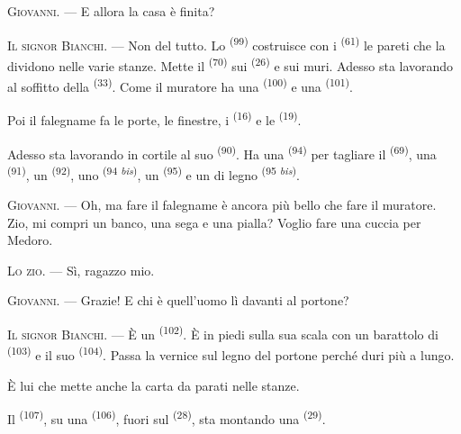 \textsc{Giovanni}. --- E allora la casa è finita?

\VUsaut{3.0mm}
\VUsaut{3.0mm}

\textsc{Il signor Bianchi}. --- Non del tutto. Lo 
\textsuperscript{(99)} costruisce con i  \textsuperscript{(61)} le
pareti che la dividono nelle varie stanze. Mette il 
\textsuperscript{(70)} sui  \textsuperscript{(26)} e sui muri.
Adesso sta lavorando al soffitto della  \textsuperscript{(33)}. Come
il muratore ha una  \textsuperscript{(100)} e una
 \textsuperscript{(101)}.

Poi il falegname fa le porte, le finestre, i 
\textsuperscript{(16)} e le  \textsuperscript{(19)}.

Adesso sta lavorando in cortile al suo  \textsuperscript{(90)}. Ha una
 \textsuperscript{(94)} per tagliare il 
\textsuperscript{(69)}, una  \textsuperscript{(91)}, un
 \textsuperscript{(92)}, uno 
\textsuperscript{(94 \textit{bis})}, un  \textsuperscript{(95)} e un
 di legno \textsuperscript{(95 \textit{bis})}.

\textsc{Giovanni}. --- Oh, ma fare il falegname è ancora più bello che fare il
muratore. Zio, mi compri un banco, una sega e una pialla? Voglio fare una cuccia per
Medoro.

\textsc{Lo zio}. --- Sì, ragazzo mio.

\textsc{Giovanni}. --- Grazie! E chi è quell'uomo lì davanti al portone?

\VUsaut{3.0mm}
\VUsaut{3.0mm}

\textsc{Il signor Bianchi}. --- È un  \textsuperscript{(102)}. È in
piedi sulla sua scala con un barattolo di  \textsuperscript{(103)} e il
suo  \textsuperscript{(104)}. Passa la vernice sul legno del portone
perché duri più a lungo.

È lui che mette anche la carta da parati nelle stanze.

Il  \textsuperscript{(107)}, su una 
\textsuperscript{(106)}, fuori sul  \textsuperscript{(28)}, sta
montando una  \textsuperscript{(29)}.

